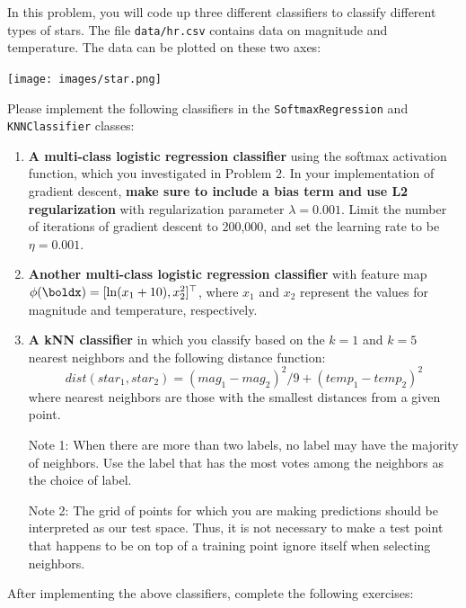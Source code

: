 \documentclass[submit]{harvardml}
\begin{document}
\begin{problem}
In this problem, you will code up three different classifiers to classify different types of stars. The file \verb|data/hr.csv| contains data on magnitude and temperature. The data can be plotted on these two axes:
\begin{center}
\texttt{[image: images/star.png]}
\end{center}

Please implement the following classifiers in the \verb|SoftmaxRegression| and \verb|KNNClassifier| classes:

\begin{enumerate}[label=\alph*)]

\item \textbf{A multi-class logistic regression classifier} using the softmax activation function, which you investigated in Problem 2. In your implementation of gradient descent, \textbf{make sure to include a bias term and use L2 regularization} with regularization parameter $\lambda = 0.001$. Limit the number of iterations of gradient descent to 200,000, and set the learning rate to be $\eta = 0.001$.

\item \textbf{Another multi-class logistic regression classifier} with feature map $\phi(\boldx) = [\ln (x_1 + 10), x_2^2]^\top$, where $x_1$ and $x_2$ represent the values for magnitude and temperature, respectively.

\item \textbf{A kNN classifier} in which you classify based on the $k = 1$ and $k = 5$ nearest neighbors and the following distance function: $$dist(star_1, star_2) = (mag_1 - mag_2)^2/9 + (temp_1 - temp_2)^2$$
where nearest neighbors are those with the smallest distances from a given point.

  Note 1: When there are more than two labels, no label may have the
  majority of neighbors.  Use the label that has the most votes among
  the neighbors as the choice of label. 

  Note 2: The grid of points for which you are making predictions
  should be interpreted as our test space.  Thus, it is not necessary
  to make a test point that happens to be on top of a training point
  ignore itself when selecting neighbors.

\end{enumerate}

After implementing the above classifiers, complete the following exercises:


\end{problem}
\end{document}
